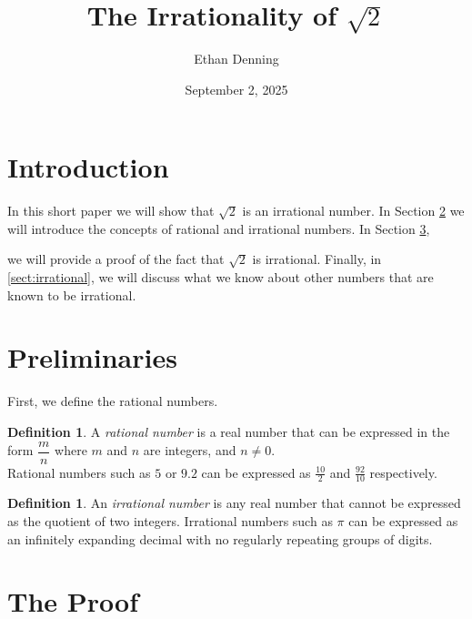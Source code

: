 \documentclass[12pt]{article}
\title{The Irrationality of $\sqrt {2}$ }
\author{Ethan Denning}
\date{September 2, 2025}
\theoremstyle{plain}
\theoremstyle{definition}
\newtheorem{defi}[thm]{Definition}
\begin{document}
\maketitle

    \section{Introduction}
    
    In this short paper we will show that $\sqrt{2}$ is an irrational number. In Section \ref{sect:prelim} we will introduce the concepts of rational and irrational numbers. In Section \ref{sect:proof},
    
    
    we will provide a proof of the fact that $\sqrt{2}$ is irrational. Finally, in \ref{sect:irrational}, we will discuss what we know about other numbers that are known to be irrational. 

    \section{Preliminaries} \label{sect:prelim}

    First, we define the rational numbers.

    \begin{defi}\label{defi:rational}
        A \emph{rational number} is a real number that can be expressed in the form $\dfrac{m}{n}$ where $m$ and $n$ are integers, and $n\ne 0$. \\
        Rational numbers such as $5$ or $9.2$ can be expressed as $\frac{10}{2}$ and $\frac{92}{10}$ respectively. 
    \end{defi}

    \begin{defi}\label{defi:irrationality}
        An \emph{irrational number} is any real number that cannot be expressed as the quotient of two integers. Irrational numbers such as $\pi$ can be expressed as an infinitely expanding decimal with no regularly repeating groups of digits. 
    \end{defi}
    
    \section{The Proof} \label{sect:proof}
\end{document}
